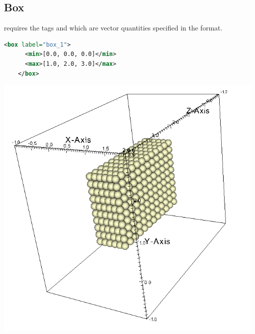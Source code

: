 \subsection{Box}
\begin{minipage}{0.6\textwidth}
   requires the tags  and  which are
  vector quantities specified in the \Textsfc{[a, b, c]} format.
  \begin{lstlisting}[language=XML]
    <box label="box_1">
      <min>[0.0, 0.0, 0.0]</min>
      <max>[1.0, 2.0, 3.0]</max>
    </box>
  \end{lstlisting}
\end{minipage}
\begin{minipage}{0.4\textwidth}
  \centering
  \includegraphics[width=0.9\columnwidth]{FIGS/geometry/geom_box.png}
\end{minipage}

